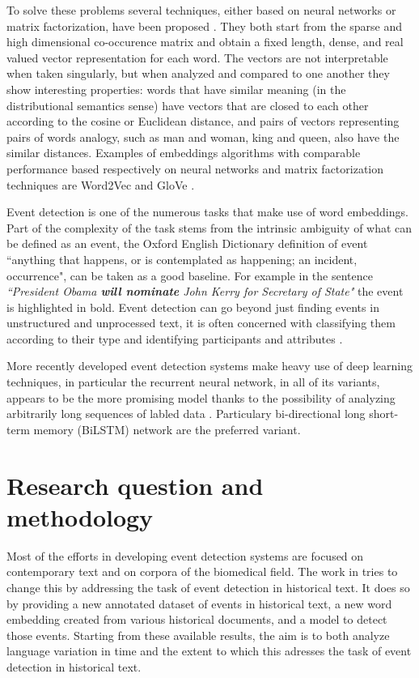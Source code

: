 \documentclass[runningheads]{llncs}
\begin{document}
To solve these problems several techniques, either based on neural networks or matrix factorization, have been proposed \cite{embeddings}. They both start from the sparse and high dimensional co-occurence matrix and obtain a fixed length, dense, and real valued vector representation for each word. The vectors are not interpretable when taken singularly, but when analyzed and compared to one another they show interesting properties: words that have similar meaning (in the distributional semantics sense) have vectors that are closed to each other according to the cosine or Euclidean distance, and pairs of vectors representing pairs of words analogy, such as man and woman, king and queen, also have the similar distances. Examples of embeddings algorithms with comparable performance based respectively on neural networks and matrix factorization techniques are Word2Vec \cite{wtv} and GloVe \cite{glove}.

Event detection is one of the numerous tasks that make use of word embeddings. Part of the complexity of the task stems from the intrinsic ambiguity of what can be defined as an event, the Oxford English Dictionary definition of event ``anything that happens, or is contemplated as happening; an incident, occurrence", can be taken as a good baseline. For example in the sentence \textit{``President Obama \textbf{will nominate} John Kerry for Secretary of State"} the event is highlighted in bold. Event detection can go beyond just finding events in unstructured and unprocessed text, it is often concerned with classifying them according to their type and identifying participants and attributes \cite{event-survey1}.

More recently developed event detection systems make heavy use of deep learning techniques, in particular the recurrent neural network, in all of its variants, appears to be the more promising model thanks to the possibility of analyzing arbitrarily long sequences of labled data \cite{event-survey2}. Particulary bi-directional long short-term memory (BiLSTM) network are the preferred variant.

\section{Research question and methodology}

Most of the efforts in developing event detection systems are focused on contemporary text and on corpora of the biomedical field. The work in \cite{histo} tries to change this by addressing the task of event detection in historical text. It does so by providing a new annotated dataset of events in historical text, a new word embedding created from various historical documents, and a model to detect those events. Starting from these available results, the aim is to both analyze language variation in time and the extent to which this adresses the task of event detection in historical text.
\end{document}
